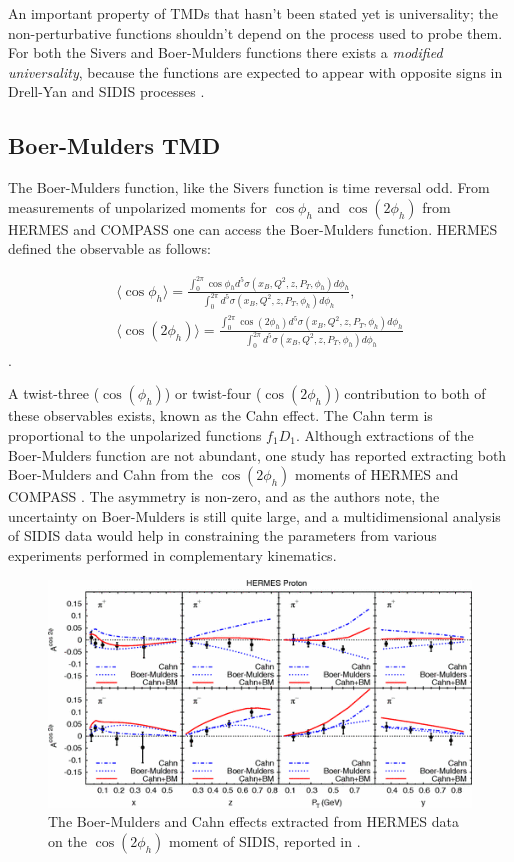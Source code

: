 An important property of TMDs that hasn't been stated yet is universality; the non-perturbative functions shouldn't depend on the process used to probe them.  For both the Sivers and Boer-Mulders functions there exists a \textit{modified universality}, because the functions are expected to appear with opposite signs in Drell-Yan and SIDIS processes \cite{tmds-collins:2002}.

\subsection{Boer-Mulders TMD}
The Boer-Mulders function, like the Sivers function is time reversal odd.  From measurements of unpolarized moments for $\cos\phi_h$ and $\cos(2\phi_h)$ from HERMES and COMPASS one can access the Boer-Mulders function.  HERMES defined the observable as follows:

\begin{gather}
	\langle \cos\phi_h \rangle = \frac{\int_{0}^{2\pi} \cos\phi_h d^5\sigma(x_B, Q^2, z, P_T, \phi_h) d\phi_h}{\int_{0}^{2\pi} d^5\sigma(x_B, Q^2, z, P_T, \phi_h) d\phi_h}, \\
	\langle \cos(2\phi_h) \rangle = \frac{\int_{0}^{2\pi} \cos(2\phi_h) d^5\sigma(x_B, Q^2, z, P_T, \phi_h) d\phi_h}{\int_{0}^{2\pi} d^5\sigma(x_B, Q^2, z, P_T, \phi_h) d\phi_h}
\end{gather}.

A twist-three ($\cos(\phi_h)$) or twist-four ($\cos(2\phi_h)$) contribution to both of these observables exists, known as the Cahn effect.  The Cahn term is proportional to the unpolarized functions $f_1 D_1$.  Although extractions of the Boer-Mulders function are not abundant, one study has reported extracting both Boer-Mulders and Cahn from the $\cos(2\phi_h)$ moments of HERMES and COMPASS \cite{tmds-barone:2009}.  The asymmetry is non-zero, and as the authors note, the uncertainty on Boer-Mulders is still quite large, and a multidimensional analysis of SIDIS data would help in constraining the parameters from various experiments performed in complementary kinematics.

\begin{figure}
	\centering
	\includegraphics[width = \textwidth]{image/plots/introduction/boermulders.png}
	\caption{The Boer-Mulders and Cahn effects extracted from HERMES data on the $\cos(2\phi_h)$ moment of SIDIS, reported in \cite{tmds-barone:2009}. }
	\label{fig:boermulders}
\end{figure}

